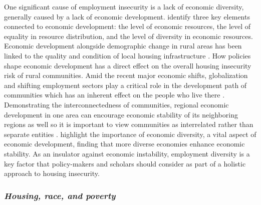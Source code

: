 One significant cause of employment insecurity is a lack of economic diversity, generally caused by a lack of economic development. \citet{sherrieb_measuring_2010} identify three key elements connected to economic development: the level of economic resources, the level of equality in resource distribution, and the level of diversity in economic resources. Economic development alongside demographic change in rural areas has been linked to the quality and condition of local housing infrastructure \citep{barcus_heterogeneity_2011}. How policies shape economic development has a direct effect on the overall housing insecurity risk of rural communities. Amid the recent major economic shifts, globalization and shifting employment sectors play a critical role in the development path of communities which has an inherent effect on the people who live there \citep{harrison_spatial_2019}. Demonstrating the interconnectedness of communities, regional economic development in one area can encourage economic stability of its neighboring regions as well so it is important to view communities as interrelated rather than separate entities \citep{chen_economic_2018}. \citet{deller_spatial_2016} highlight the importance of economic diversity, a vital aspect of economic development, finding that more diverse economies enhance economic stability. As an insulator against economic instability, employment diversity is a key factor that policy-makers and scholars should consider as part of a holistic approach to housing insecurity. 

\subsubsection{\textit{Housing, race, and poverty}}

